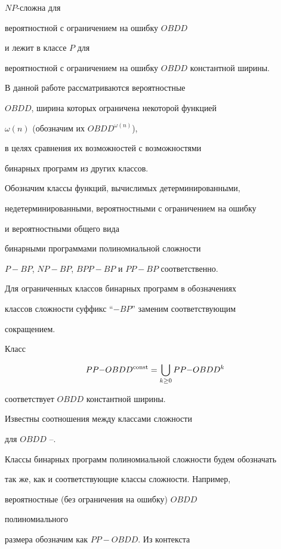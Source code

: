 $NP$-сложна для


вероятностной с ограничением на ошибку $OBDD$


и лежит в классе $P$ для


вероятностной с ограничением на ошибку $OBDD$ константной ширины.





В данной работе рассматриваются вероятностные 


$OBDD$, ширина которых ограничена некоторой функцией


$\omega(n)$ (обозначим их $OBDD^{\omega(n)}$),


в целях сравнения их возможностей с возможностями


бинарных программ из других классов.





Обозначим классы функций, вычислимых детерминированными,


недетерминированными, вероятностными с ограничением на ошибку


и вероятностными общего вида


бинарными программами полиномиальной сложности


$P{-}BP$, $NP{-}BP$, $BPP{-}BP$ и $PP{-}BP$ соответственно.


Для ограниченных классов бинарных программ в обозначениях


классов сложности суффикс ``${-}BP$'' заменим соответствующим


сокращением.


Класс 


$$


PP{-}OBDD^{\const}=\bigcup_{k\ge 0}PP{-}OBDD^k 


$$


соответствует $OBDD$ константной ширины.


Известны соотношения между классами сложности


для $OBDD$ \cite{A97}--\cite{KM99b}.





Классы бинарных программ полиномиальной сложности будем обозначать


так же, как и соответствующие классы сложности. Например,


вероятностные (без ограничения на ошибку) $OBDD$


полиномиального


размера обозначим как $PP{-}OBDD$. Из контекста



